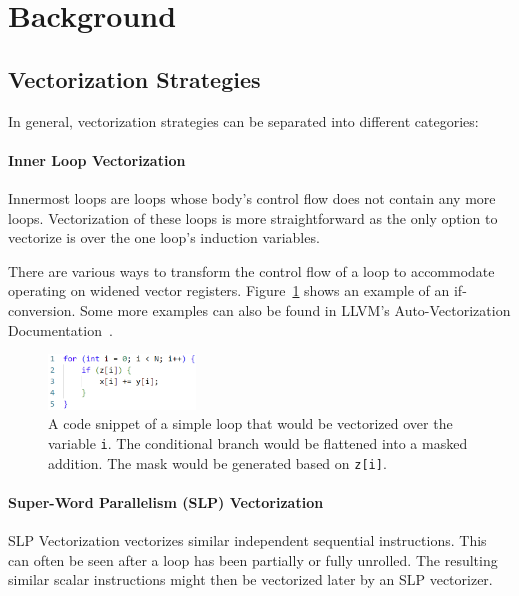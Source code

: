 \documentclass[sigplan,11pt,nonacm]{acmart}
\begin{document}


\section{Background}
\label{sec:background}

\subsection{Vectorization Strategies}
\label{back:vec-strat}
In general, vectorization strategies can be separated into different categories:

\paragraph{Inner Loop Vectorization}
Innermost loops are loops whose body's control flow does not contain any more loops.
Vectorization of these loops is more straightforward as the only option to vectorize is over 
the one loop's induction variables.

There are various ways to transform the control flow of a loop to accommodate operating on widened
vector registers. Figure~\ref{fig:inner-loop-vec} shows an example of an if-conversion. Some more
examples can also be found in LLVM's Auto-Vectorization Documentation~\cite{llvmvec}.

\begin{figure}
  \centering
  \includegraphics[width=0.35\textwidth]{images/inner-loop-vec.png}
  \caption{A code snippet of a simple loop that would be vectorized over the variable \texttt{i}. 
  The conditional branch would be flattened into a masked addition. The mask would be generated 
  based on \texttt{z[i]}.}
  \label{fig:inner-loop-vec}
\end{figure}

\paragraph{Super-Word Parallelism (SLP) Vectorization}
SLP Vectorization vectorizes similar independent sequential instructions. This can often be seen 
after a loop has been partially or fully unrolled. The resulting similar scalar 
instructions might then be vectorized later by an SLP vectorizer.
\end{document}
